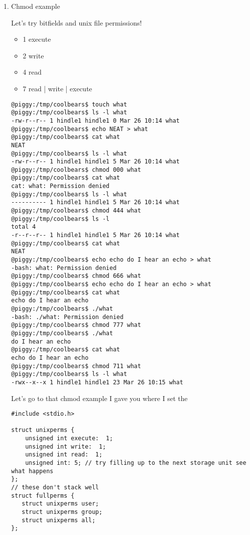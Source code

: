 \documentclass[11pt]{article}
\begin{document}
\begin{enumerate}
\item Chmod example
\label{sec:org9c71808}

Let's try bitfields and unix file permissions!

\begin{itemize}
\item 1 execute
\item 2 write
\item 4 read

\item 7 read | write | execute
\end{itemize}

\begin{verbatim}
@piggy:/tmp/coolbears$ touch what
@piggy:/tmp/coolbears$ ls -l what
-rw-r--r-- 1 hindle1 hindle1 0 Mar 26 10:14 what
@piggy:/tmp/coolbears$ echo NEAT > what
@piggy:/tmp/coolbears$ cat what
NEAT
@piggy:/tmp/coolbears$ ls -l what
-rw-r--r-- 1 hindle1 hindle1 5 Mar 26 10:14 what
@piggy:/tmp/coolbears$ chmod 000 what
@piggy:/tmp/coolbears$ cat what
cat: what: Permission denied
@piggy:/tmp/coolbears$ ls -l what
---------- 1 hindle1 hindle1 5 Mar 26 10:14 what
@piggy:/tmp/coolbears$ chmod 444 what
@piggy:/tmp/coolbears$ ls -l
total 4
-r--r--r-- 1 hindle1 hindle1 5 Mar 26 10:14 what
@piggy:/tmp/coolbears$ cat what
NEAT
@piggy:/tmp/coolbears$ echo echo do I hear an echo > what
-bash: what: Permission denied
@piggy:/tmp/coolbears$ chmod 666 what
@piggy:/tmp/coolbears$ echo echo do I hear an echo > what
@piggy:/tmp/coolbears$ cat what
echo do I hear an echo
@piggy:/tmp/coolbears$ ./what
-bash: ./what: Permission denied
@piggy:/tmp/coolbears$ chmod 777 what
@piggy:/tmp/coolbears$ ./what
do I hear an echo
@piggy:/tmp/coolbears$ cat what
echo do I hear an echo
@piggy:/tmp/coolbears$ chmod 711 what
@piggy:/tmp/coolbears$ ls -l what
-rwx--x--x 1 hindle1 hindle1 23 Mar 26 10:15 what
\end{verbatim}

Let's go to that chmod example I gave you where I set the 

\begin{verbatim}
#include <stdio.h>

struct unixperms {
    unsigned int execute:  1;
    unsigned int write:  1;
    unsigned int read:  1;
    unsigned int: 5; // try filling up to the next storage unit see what happens
};
// these don't stack well
struct fullperms {
   struct unixperms user;
   struct unixperms group;
   struct unixperms all;
};


\end{verbatim}
\end{enumerate}
\end{document}
